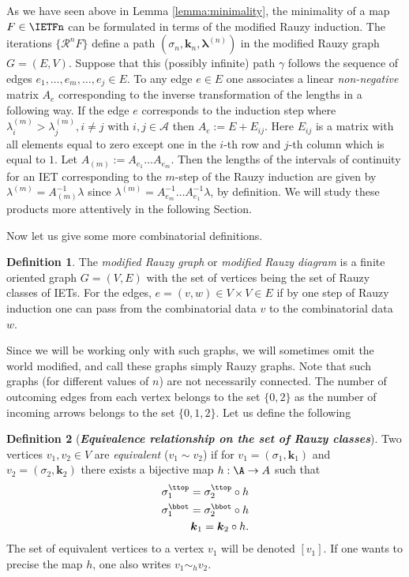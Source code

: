 \documentclass[12pt]{article}
\theoremstyle{definition}
\newtheorem{definition}{Definition}
\begin{document}
As we have seen above in Lemma \ref{lemma:minimality}, the minimality of a map $F \in \IETFn$ can be formulated in terms of the modified Rauzy induction. The iterations $\{\mathcal{R}^n F\}$ define a path $(\sigma_n, \boldsymbol{k}_n, \boldsymbol{\lambda}^{(n)})$ in the modified Rauzy graph $G=(E,V)$.  Suppose that this (possibly infinite) path $\gamma$ follows the sequence of edges $e_1, \ldots, e_{m}, \ldots, e_j \in E$. To any edge $e \in E$ one associates a linear \emph{non-negative} matrix $A_e$ corresponding to the inverse transformation of the lengths in a following way. If the edge $e$ corresponds to the induction step where $\lambda^{(m)}_i>\lambda^{(m)}_j, i \neq j$ with $ i,j \in \mathcal{A}$ then $A_e:=E+E_{ij}$. Here $E_{ij}$ is a matrix with all elements equal to zero except one in the $i$-th row and $j$-th column which is equal to $1$. Let $A_{(m)}:=A_{e_1} \ldots A_{e_m}$. Then the lengths of the intervals of continuity for an IET corresponding to the $m$-step of the Rauzy induction are given by $\lambda^{(m)}=A_{(m)}^{-1} \lambda$ since $\lambda^{(m)}= A_{e_m}^{-1} \ldots A_{e_1}^{-1} \lambda$, by definition. We will study these products more attentively in the following Section. 

Now let us give some more combinatorial definitions.


\begin{definition}
The \emph{modified Rauzy graph} or \emph{modified Rauzy diagram} is a finite oriented graph $G=(V,E)$ with the set of vertices being the set of Rauzy classes of IETs. For the edges, $e=(v,w) \in V \times V \in E$ if by one step of Rauzy induction one can pass from the combinatorial data $v$ to the combinatorial data $w$. 
\end{definition}

Since we will be working only with such graphs, we will sometimes omit the world modified, and call these graphs simply Rauzy graphs. Note that such graphs (for different values of $n$) are not necessarily connected. The number of outcoming edges from each vertex belongs to the set $\{0,2\}$ as the number of incoming arrows belongs to the set $\{0,1,2\}$.  Let us define the following

\begin{definition}[{\emph{\textbf{Equivalence relationship on the set of Rauzy classes}}}]\label{def:equivalence_relationship}
Two vertices $v_1,v_2 \in V$ are \emph{equivalent} ($v_1 \sim v_2$) if for $v_1=(\sigma_1, \boldsymbol{k}_1)$ and $v_2=(\sigma_2, \boldsymbol{k}_2)$ there exists a bijective map $h: \A \rightarrow A$ such that
\begin{align*}
\sigma^{\ttop}_1=\sigma^{\ttop}_2 \circ h \\
\sigma^{\bbot}_1=\sigma^{\bbot}_2 \circ h \\
\boldsymbol{k}_1=\boldsymbol{k}_2 \circ h.
\end{align*}
The set of equivalent vertices to a vertex $v_1$ will be denoted $[v_1].$
If one wants to precise the map $h$, one also writes $v_1 \sim_h v_2$.
\end{definition}
\end{document}
